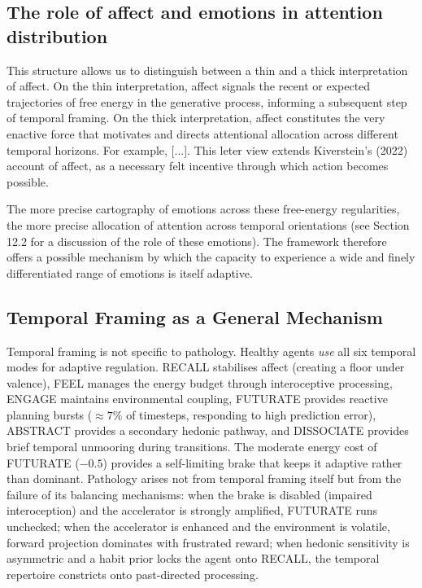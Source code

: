 \documentclass[11pt,a4paper]{article}
\newcommand{\rr}{\color{red!70!black}}
\begin{document}
{\rr 
\subsection{The role of affect and emotions in attention distribution}
This structure allows us to distinguish between a thin and a thick interpretation of affect. On the thin interpretation, affect signals the recent or expected trajectories of free energy in the generative process, informing a subsequent step of temporal framing. On the thick interpretation, affect constitutes the very enactive force that motivates and directs attentional allocation across different temporal horizons. For example, [...]. This leter view extends Kiverstein's (2022) account of affect, as a necessary felt incentive through which action becomes possible.}
The more precise cartography of emotions across these free-energy regularities, the more precise allocation of attention across temporal orientations (see Section 12.2 for a discussion of the role of these emotions). The framework therefore offers a possible mechanism by which the capacity to experience a wide and finely differentiated range of emotions is itself adaptive. 


\subsection{Temporal Framing as a General Mechanism}\label{sec:general_mechanism}

Temporal framing is not specific to pathology. Healthy agents \emph{use} all six temporal modes for adaptive regulation. RECALL stabilises affect (creating a floor under valence), FEEL manages the energy budget through interoceptive processing, ENGAGE maintains environmental coupling, FUTURATE provides reactive planning bursts ($\approx 7\%$ of timesteps, responding to high prediction error), ABSTRACT provides a secondary hedonic pathway, and DISSOCIATE provides brief temporal unmooring during transitions. The moderate energy cost of FUTURATE ($-0.5$) provides a self-limiting brake that keeps it adaptive rather than dominant. Pathology arises not from temporal framing itself but from the failure of its balancing mechanisms: when the brake is disabled (impaired interoception) and the accelerator is strongly amplified, FUTURATE runs unchecked; when the accelerator is enhanced and the environment is volatile, forward projection dominates with frustrated reward; when hedonic sensitivity is asymmetric and a habit prior locks the agent onto RECALL, the temporal repertoire constricts onto past-directed processing.
\end{document}

